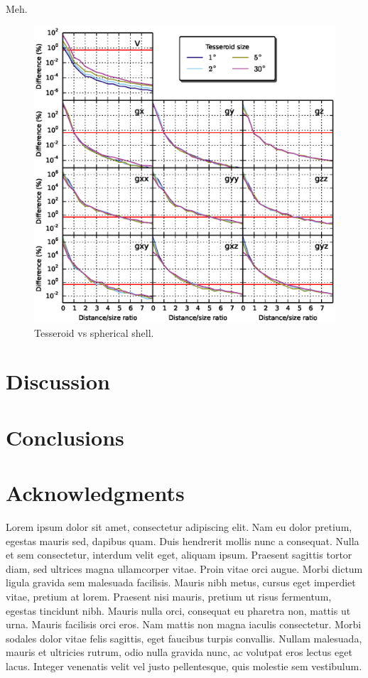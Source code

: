 \documentclass[extra]{gji}
\begin{document}
Meh.

\begin{figure}
    \centering
    \includegraphics{figs/tesseroid-x-shell}
    \caption{
        Tesseroid vs spherical shell.
    }
    \label{fig:tesseroid-x-shell}
\end{figure}

\section{Discussion}

\section{Conclusions}

\section{Acknowledgments}

Lorem ipsum dolor sit amet, consectetur adipiscing elit. Nam eu dolor pretium,
egestas mauris sed, dapibus quam. Duis hendrerit mollis nunc a consequat. Nulla
et sem consectetur, interdum velit eget, aliquam ipsum. Praesent sagittis
tortor diam, sed ultrices magna ullamcorper vitae. Proin vitae orci augue.
Morbi dictum ligula gravida sem malesuada facilisis. Mauris nibh metus, cursus
eget imperdiet vitae, pretium at lorem. Praesent nisi mauris, pretium ut risus
fermentum, egestas tincidunt nibh. Mauris nulla orci, consequat eu pharetra
non, mattis ut urna. Mauris facilisis orci eros. Nam mattis non magna iaculis
consectetur. Morbi sodales dolor vitae felis sagittis, eget faucibus turpis
convallis. Nullam malesuada, mauris et ultricies rutrum, odio nulla gravida
nunc, ac volutpat eros lectus eget lacus. Integer venenatis velit vel justo
pellentesque, quis molestie sem vestibulum.



\end{document}
